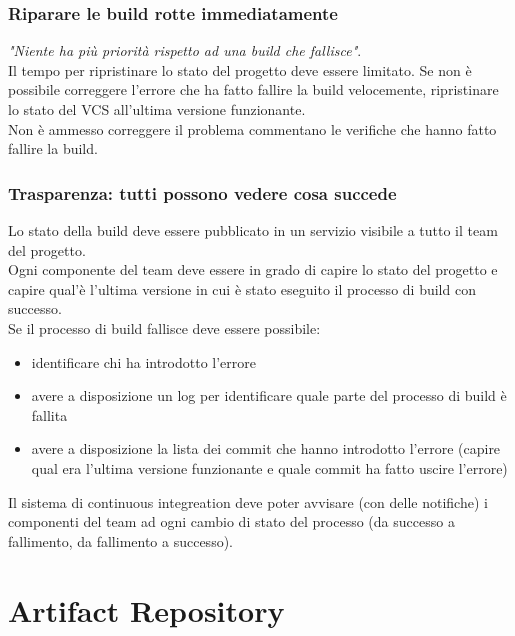 \documentclass[10pt, a4paper]{article}
\begin{document}
\subsubsection*{Riparare le build rotte immediatamente}
\textit{"Niente ha più priorità rispetto ad una build che fallisce"}.\\
Il tempo per ripristinare lo stato del progetto deve essere limitato. Se non è possibile
correggere l’errore che ha fatto fallire la build velocemente, ripristinare lo stato del VCS
all’ultima versione funzionante.\\
Non è ammesso correggere il problema commentano le verifiche che hanno fatto fallire la build.

\subsubsection*{Trasparenza: tutti possono vedere cosa succede}
Lo stato della build deve essere pubblicato in un servizio visibile a tutto il team del
progetto.\\
Ogni componente del team deve essere in grado di capire lo stato del progetto e capire
qual’è l’ultima versione in cui è stato eseguito il processo di build con successo.\\
Se il processo di build fallisce deve essere possibile:
\begin{itemize}
    \item identificare chi ha introdotto l’errore
    \item avere a disposizione un log per identificare quale parte del processo di build è fallita
    \item avere a disposizione la lista dei commit che hanno introdotto l’errore (capire qual era l'ultima versione funzionante e quale commit ha fatto uscire l'errore)
\end{itemize}
Il sistema di continuous integreation deve poter avvisare (con delle notifiche) i
componenti del team ad ogni cambio di stato del processo (da successo a fallimento,
da fallimento a successo).

\section{Artifact Repository}
\end{document}
